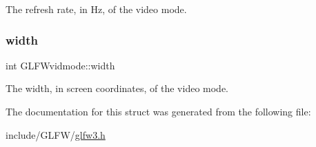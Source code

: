 The refresh rate, in Hz, of the video mode. \mbox{\label{structGLFWvidmode_a698dcb200562051a7249cb6ae154c71d}} 
\subsubsection{\texorpdfstring{width}{width}}
{\footnotesize\ttfamily int G\+L\+F\+Wvidmode\+::width}

The width, in screen coordinates, of the video mode. 

The documentation for this struct was generated from the following file\+:\begin{DoxyCompactItemize}
\item 
include/\+G\+L\+F\+W/\hyperlink{glfw3_8h}{glfw3.\+h}\end{DoxyCompactItemize}
